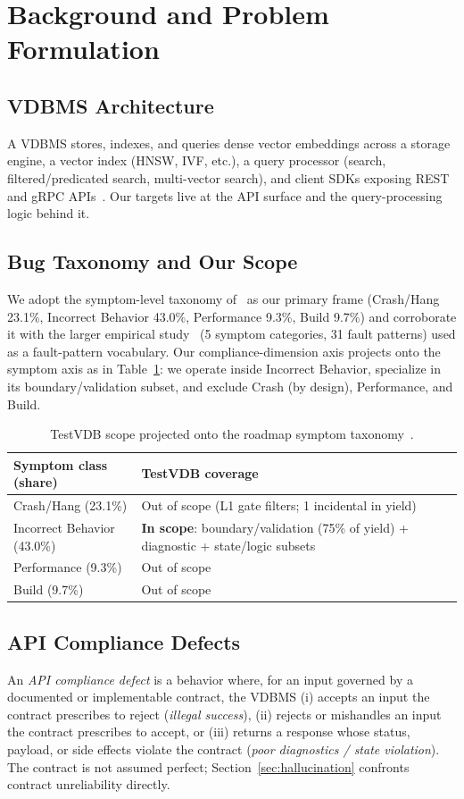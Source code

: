 \documentclass[sigconf, anonymous, review]{acmart}
\begin{document}
\section{Background and Problem Formulation}\label{sec:bg}

\subsection{VDBMS Architecture}
A VDBMS stores, indexes, and queries dense vector embeddings across a storage engine, a vector index (HNSW, IVF, etc.), a query processor (search, filtered/predicated search, multi-vector search), and client SDKs exposing REST and gRPC APIs~\cite{roadmap25}. Our targets live at the API surface and the query-processing logic behind it.

\subsection{Bug Taxonomy and Our Scope}
We adopt the symptom-level taxonomy of~\cite{roadmap25} as our primary frame (Crash/Hang 23.1\%, Incorrect Behavior 43.0\%, Performance 9.3\%, Build 9.7\%) and corroborate it with the larger empirical study~\cite{bugstudy25} (5 symptom categories, 31 fault patterns) used as a fault-pattern vocabulary. Our compliance-dimension axis projects onto the symptom axis as in Table~\ref{tab:scope}: we operate inside Incorrect Behavior, specialize in its boundary/validation subset, and exclude Crash (by design), Performance, and Build.

\begin{table}[t]
\caption{TestVDB scope projected onto the roadmap symptom taxonomy~\cite{roadmap25}.}
\label{tab:scope}
\small
\begin{tabular}{@{}p{}p{}@{}}
\toprule
Symptom class (share) & TestVDB coverage \\
\midrule
Crash/Hang (23.1\%) & Out of scope (L1 gate filters; 1 incidental in yield) \\
Incorrect Behavior (43.0\%) & \textbf{In scope}: boundary/validation (75\% of yield) + diagnostic + state/logic subsets \\
Performance (9.3\%) & Out of scope \\
Build (9.7\%) & Out of scope \\
\bottomrule
\end{tabular}
\end{table}

\subsection{API Compliance Defects}
An \emph{API compliance defect} is a behavior where, for an input governed by a documented or implementable contract, the VDBMS (i) accepts an input the contract prescribes to reject (\emph{illegal success}), (ii) rejects or mishandles an input the contract prescribes to accept, or (iii) returns a response whose status, payload, or side effects violate the contract (\emph{poor diagnostics / state violation}). The contract is not assumed perfect; Section~\ref{sec:hallucination} confronts contract unreliability directly.
\end{document}
